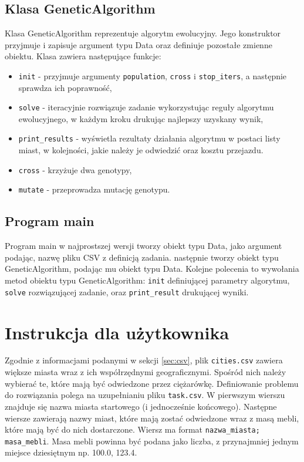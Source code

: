 \documentclass[12pt, oneside, final]{report}
\begin{document}
\subsection{Klasa GeneticAlgorithm}
Klasa GeneticAlgorithm reprezentuje algorytm ewolucyjny. Jego konstruktor przyjmuje i zapisuje argument typu Data oraz definiuje pozostałe zmienne obiektu. Klasa zawiera następujące funkcje:
\begin{itemize}
\item \texttt{init} - przyjmuje argumenty \texttt{population}, \texttt{cross} i \texttt{stop\_iters}, a następnie sprawdza ich poprawność,
\item \texttt{solve} - iteracyjnie rozwiązuje  zadanie wykorzystując reguły algorytmu ewolucyjnego, w każdym kroku drukując najlepszy uzyskany wynik,
\item \texttt{print\_results} - wyświetla rezultaty działania algorytmu w postaci listy miast, w kolejności, jakie należy je odwiedzić oraz kosztu przejazdu.
\item \texttt{cross} - krzyżuje dwa genotypy,
\item \texttt{mutate} - przeprowadza mutację genotypu.
\end{itemize}

\subsection{Program main}
Program main w najprostszej wersji tworzy obiekt typu Data, jako argument podając, nazwę pliku CSV z definicją zadania. następnie tworzy obiekt typu GeneticAlgorithm, podając mu obiekt typu Data. Kolejne polecenia to wywołania metod obiektu typu GeneticAlgorithm: \texttt{init} definiującej parametry algorytmu, \texttt{solve} rozwiązującej zadanie, oraz \texttt{print\_result} drukującej wyniki.

\section{Instrukcja dla użytkownika}
Zgodnie z informacjami podanymi w sekcji \ref{sec:csv}, plik \texttt{cities.csv} zawiera większe miasta wraz z ich współrzędnymi geograficznymi. Spośród nich należy wybierać te, które mają być odwiedzone przez ciężarówkę. Definiowanie problemu do rozwiązania polega na uzupełnianiu pliku \texttt{task.csv}. W pierwszym wierszu znajduje się nazwa miasta startowego (i jednocześnie końcowego). Następne wiersze zawierają nazwy miast, które mają zostać odwiedzone wraz z masą mebli, które mają być do nich dostarczone. Wiersz ma format \texttt{nazwa\_miasta; masa\_mebli}. Masa mebli powinna być podana jako liczba, z przynajmniej jednym miejsce dziesiętnym np. 100.0, 123.4.
\end{document}
